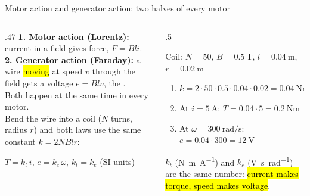 \documentclass[aspectratio=169,10pt]{beamer}
\begin{document}
\begin{frame}{Motor action and generator action: two halves of every motor}
\begin{columns}[T]
\begin{column}{.47\textwidth}
\small
\textbf{1. Motor action (Lorentz):} current in a field gives force, $F=Bli$.\\[1mm]
\textbf{2. Generator action (Faraday):} a wire \hl{moving} at speed $v$ through the field gets a voltage $e=Blv$, the .\\[1mm]
Both happen at the same time in every motor.\\[2mm]
Bend the wire into a coil ($N$ turns, radius $r$) and both laws use the same constant $k=2NBlr$:
\begin{eqbox}
$T=k_t\,i$, \qquad $e=k_e\,\omega$, \qquad $k_t=k_e$ (SI units)
\end{eqbox}
\end{column}
\begin{column}{.5\textwidth}
\begin{defbox}
\small
Coil: $N=50$, $B=\SI{0.5}{\tesla}$, $l=\SI{0.04}{\metre}$, $r=\SI{0.02}{\metre}$
\begin{enumerate}\setlength\itemsep{1pt}
\item $k=2\cdot50\cdot0.5\cdot0.04\cdot0.02=\SI{0.04}{\newton\metre\per\ampere}$
\item At $i=\SI{5}{\ampere}$: $T=0.04\cdot5=\SI{0.2}{\newton\metre}$
\item At $\omega=\SI{300}{\radian\per\second}$: $e=0.04\cdot300=\SI{12}{\volt}$
\end{enumerate}
\end{defbox}
\begin{keybox}
\small
{} $k_t$ (\si{\newton\metre\per\ampere}) and  $k_e$ (\si{\volt\second\per\radian}) are the same number: \hl{current makes torque, speed makes voltage}.
\end{keybox}
\end{column}
\end{columns}
\end{frame}
\end{document}
